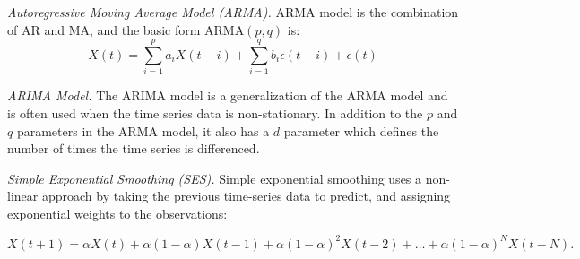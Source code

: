 \documentclass[11pt]{article}
\begin{document}
\textit{Autoregressive Moving Average Model (ARMA).} ARMA model is the combination of AR and MA, and the basic form ARMA$(p,q)$ is:
\begin{equation}
	X(t) = \sum_{i=1}^{p}a_iX(t-i)+\sum_{i=1}^{q}b_i\epsilon(t-i)+\epsilon(t)
\end{equation}

\textit{ARIMA Model.} The ARIMA model is a generalization of the ARMA model and is often used when the time series data is non-stationary. In addition to the $p$ and $q$ parameters in the ARMA model, it also has a $d$ parameter which defines the number of times the time series is differenced. 

\textit{Simple Exponential Smoothing (SES).} Simple exponential smoothing uses a non-linear approach by taking the previous time-series data to predict, and assigning exponential weights to the observations:

\begin{equation}
	X(t+1)=\alpha X(t)+\alpha(1-\alpha)X(t-1)+\alpha(1-\alpha)^2X(t-2)+\ldots+\alpha(1-\alpha)^N X(t-N).
\end{equation}
\end{document}
